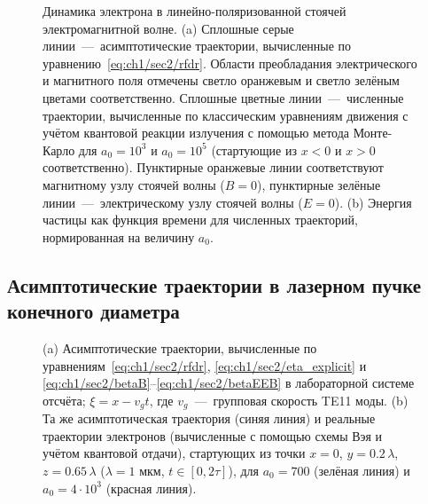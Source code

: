 \begin{figure}[ht]
    \caption[Динамика электрона в линейно-поляризованной стоячей электромагнитной волне]{Динамика электрона в линейно-поляризованной стоячей электромагнитной волне. (a) Сплошные серые линии~---~асимптотические траектории, вычисленные по уравнению~\eqref{eq:ch1/sec2/rfdr}. Области преобладания электрического и магнитного поля отмечены светло оранжевым и светло зелёным цветами соответственно. Сплошные цветные линии~---~численные траектории, вычисленные по классическим уравнениям движения с учётом квантовой реакции излучения с помощью метода Монте-Карло для $a_0 = 10^3$ и $a_0 = 10^5$ (стартующие из $x < 0$ и $x > 0$ соответственно). Пунктирные оранжевые линии соответствуют магнитному узлу стоячей волны ($B = 0$), пунктирные зелёные линии~---~электрическому узлу стоячей волны ($E=0$).
    (b) Энергия частицы как функция времени для численных траекторий, нормированная на величину $a_0$.}
    \label{fig:ch1/sec3/onion}
\end{figure}


\subsection{Асимптотические траектории в лазерном пучке конечного диаметра}
\label{TE11}

\begin{figure}[ht]
    \caption[Динамика электрона в поле ТЕ11 моды прямоугольного волновода]{\label{fig:ch1/sec3/te11}
    (a) Асимптотические траектории, вычисленные по уравнениям~\eqref{eq:ch1/sec2/rfdr}, \eqref{eq:ch1/sec2/eta_explicit} и
    \eqref{eq:ch1/sec2/betaB}--\eqref{eq:ch1/sec2/betaEEB} в лабораторной системе отсчёта; $\xi = x - v_g t$, где
    $v_g$~---~групповая скорость TE11 моды.
    (b) Та же асимптотическая траектория (синяя линия) и реальные траектории электронов (вычисленные с помощью схемы Вэя и учётом квантовой отдачи), стартующих из точки $x = 0$, $y = 0.2 \, \lambda$, $z = 0.65 \, \lambda$ ($\lambda = 1$ мкм, $t \in [0, 2 \tau]$), для $a_0 = 700$ (зелёная линия) и $a_0 = 4 \cdot 10^3$ (красная линия).}
\end{figure}

